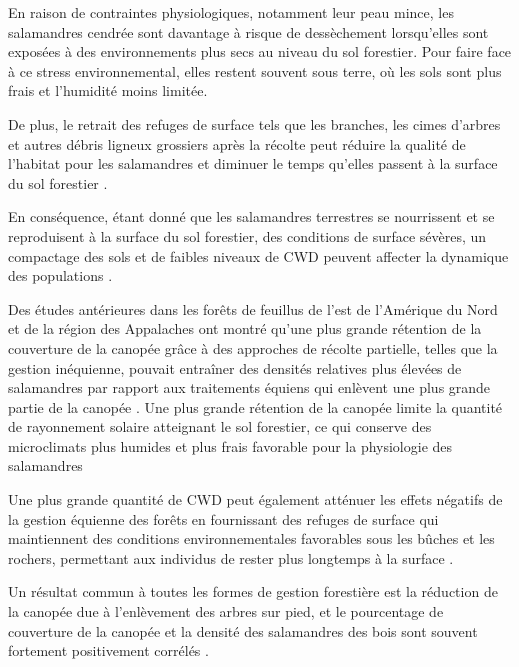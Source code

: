 En raison de contraintes physiologiques, notamment leur peau mince, les salamandres cendrée sont davantage à risque de dessèchement lorsqu'elles sont exposées à des environnements plus secs au niveau du sol forestier. 
Pour faire face à ce stress environnemental, elles restent souvent sous terre, où les sols sont plus frais et l'humidité moins limitée. 

De plus, le retrait des refuges de surface tels que les branches, les cimes d'arbres et autres débris ligneux grossiers après la récolte peut réduire la qualité de l'habitat pour les salamandres 
et diminuer le temps qu'elles passent à la surface du sol forestier \citep{Achat2015Quantifyingconsequences,Peele2017EffectsWoody}. 

En conséquence, étant donné que les salamandres terrestres se nourrissent et se reproduisent à la surface du sol forestier, des conditions de surface sévères, 
un compactage des sols et de faibles niveaux de CWD peuvent affecter la dynamique des populations \citep{Peterman2014Spatialvariation}. 

Des études antérieures dans les forêts de feuillus de l'est de l'Amérique du Nord et de la région des Appalaches ont montré qu'une plus grande rétention de la couverture de la canopée grâce à des approches de 
récolte partielle, telles que la gestion inéquienne, pouvait entraîner des densités relatives plus élevées de salamandres par rapport aux traitements équiens qui enlèvent une plus grande partie de la canopée \citep{Hocking2013Effectsexperimental,Harper2015Impactforestry,Mahoney2016Woodlandsalamander}. 
Une plus grande rétention de la canopée limite la quantité de rayonnement solaire atteignant le sol forestier, ce qui conserve des microclimats plus humides et plus frais favorable pour la physiologie des salamandres \citep{Homyack2011Energeticssurfaceactive}

Une plus grande quantité de CWD peut également atténuer les effets négatifs de la gestion équienne des forêts en fournissant des refuges de surface qui maintiennent des conditions environnementales favorables 
sous les bûches et les rochers, permettant aux individus de rester plus longtemps à la surface \citep{Grover1998Influencecover,Moseley2009Locallandscape}. 

Un résultat commun à toutes les formes de gestion forestière est la réduction de la canopée due à l'enlèvement des arbres sur pied, et le pourcentage de couverture de la canopée et 
la densité des salamandres des bois sont souvent fortement positivement corrélés \citep{Tilghman2012Metaanalysiseffects}.





